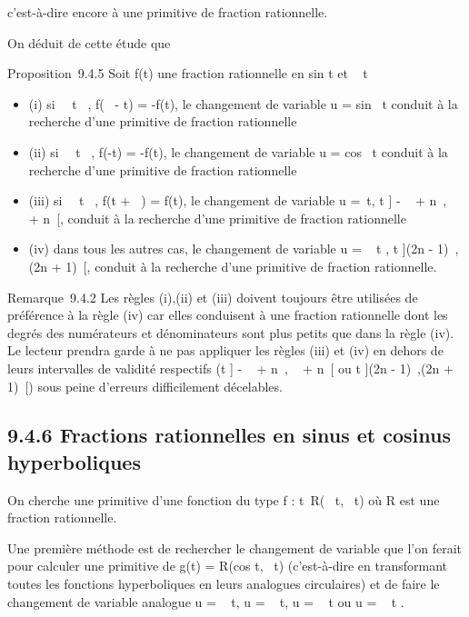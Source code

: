 \documentclass[]{article}
\begin{document}
c'est-à-dire encore à une primitive de fraction rationnelle.

On déduit de cette étude que

Proposition~9.4.5 Soit f(t) une fraction rationnelle en
sin t et \cos~ t

\begin{itemize}
\itemsep1pt\parskip0pt
\item
  (i) si \forall~~t \in {}~, f(\pi~ - t) = -f(t), le
  changement de variable u = sin~ t conduit à
  la recherche d'une primitive de fraction rationnelle
\item
  (ii) si \forall~~t \in {}~, f(-t) = -f(t), le changement
  de variable u = cos~ t conduit à la recherche
  d'une primitive de fraction rationnelle
\item
  (iii) si \forall~~t \in {}~, f(t + \pi~) = f(t), le
  changement de variable u =\
  \mathrmtg t, t \in] - \pi~  + n\pi~, \pi~ \over 2 + n\pi~[, conduit à la recherche
  d'une primitive de fraction rationnelle
\item
  (iv) dans tous les autres cas, le changement de variable u
  = \mathrmtg~  t
   , t \in](2n - 1)\pi~,(2n + 1)\pi~[, conduit à la
  recherche d'une primitive de fraction rationnelle.
\end{itemize}

Remarque~9.4.2 Les règles (i),(ii) et (iii) doivent toujours être
utilisées de préférence à la règle (iv) car elles conduisent à une
fraction rationnelle dont les degrés des numérateurs et dénominateurs
sont plus petits que dans la règle (iv). Le lecteur prendra garde à ne
pas appliquer les règles (iii) et (iv) en dehors de leurs intervalles de
validité respectifs (t \in] - \pi~  + n\pi~, \pi~
\over 2 + n\pi~[ ou t \in](2n - 1)\pi~,(2n + 1)\pi~[) sous
peine d'erreurs difficilement décelables.

\subsection{9.4.6 Fractions rationnelles en sinus et cosinus
hyperboliques}

On cherche une primitive d'une fonction du type f :
t\mapsto~R(\mathrmch~
t,\mathrmsh~ t) où R est une
fraction rationnelle.

Une première méthode est de rechercher le changement de variable que
l'on ferait pour calculer une primitive de g(t) =
R(cos t,\sin~ t)
(c'est-à-dire en transformant toutes les fonctions hyperboliques en
leurs analogues circulaires) et de faire le changement de variable
analogue u = \mathrmsh~ t, u
= \mathrmch~ t, u
= \mathrmth~ t ou u
= \mathrmth~  t
 .
\end{document}
